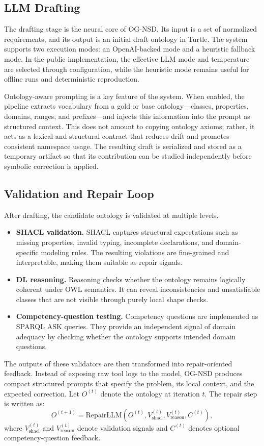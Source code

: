 \subsection{LLM Drafting}
The drafting stage is the neural core of OG-NSD. Its input is a set of normalized requirements, and its output is an initial draft ontology in Turtle. The system supports two execution modes: an OpenAI-backed mode and a heuristic fallback mode. In the public implementation, the effective LLM mode and temperature are selected through configuration, while the heuristic mode remains useful for offline runs and deterministic reproduction.

Ontology-aware prompting is a key feature of the system. When enabled, the pipeline extracts vocabulary from a gold or base ontology---classes, properties, domains, ranges, and prefixes---and injects this information into the prompt as structured context. This does not amount to copying ontology axioms; rather, it acts as a lexical and structural contract that reduces drift and promotes consistent namespace usage. The resulting draft is serialized and stored as a temporary artifact so that its contribution can be studied independently before symbolic correction is applied.

\subsection{Validation and Repair Loop}
After drafting, the candidate ontology is validated at multiple levels.
\begin{itemize}
  \item \textbf{SHACL validation.} SHACL captures structural expectations such as missing properties, invalid typing, incomplete declarations, and domain-specific modeling rules. The resulting violations are fine-grained and interpretable, making them suitable as repair signals.
  \item \textbf{DL reasoning.} Reasoning checks whether the ontology remains logically coherent under OWL semantics. It can reveal inconsistencies and unsatisfiable classes that are not visible through purely local shape checks.
  \item \textbf{Competency-question testing.} Competency questions are implemented as SPARQL ASK queries. They provide an independent signal of domain adequacy by checking whether the ontology supports intended domain questions.
\end{itemize}

The outputs of these validators are then transformed into repair-oriented feedback. Instead of exposing raw tool logs to the model, OG-NSD produces compact structured prompts that specify the problem, its local context, and the expected correction. Let $O^{(t)}$ denote the ontology at iteration $t$. The repair step is written as:
\[
O^{(t+1)}=\mathrm{RepairLLM}(O^{(t)},V_{\mathrm{shacl}}^{(t)},V_{\mathrm{reason}}^{(t)},C^{(t)}),
\]
where $V_{\mathrm{shacl}}^{(t)}$ and $V_{\mathrm{reason}}^{(t)}$ denote validation signals and $C^{(t)}$ denotes optional competency-question feedback.

